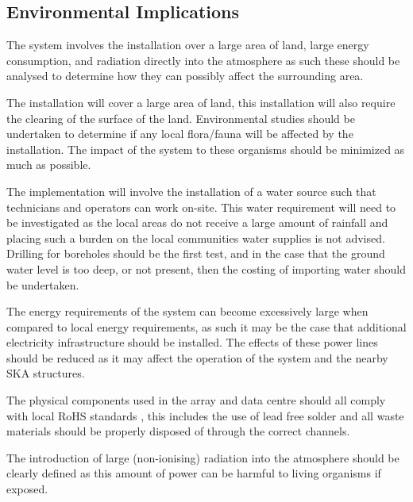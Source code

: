 \documentclass[11pt]{witseiepaper}
\begin{document}
\begin{bibunit}[witseie]


\subsection{Environmental Implications} \label{sec:EnvironmentalImplications}
The system involves the installation over a large area of land, large energy consumption, and radiation directly into the atmosphere as such these should be analysed to determine how they can possibly affect the surrounding area.

The installation will cover a large area of land, this installation will also require the clearing of the surface of the land. Environmental studies should be undertaken to determine if any local flora/fauna will be affected by the installation. The impact of the system to these organisms should be minimized as much as possible.

The implementation will involve the installation of a water source such that technicians and operators can work on-site. This water requirement will need to be investigated as the local areas do not receive a large amount of rainfall and placing such a burden on the local communities water supplies is not advised. Drilling for boreholes should be the first test, and in the case that the ground water level is too deep, or not present, then the costing of importing water should be undertaken.

The energy requirements of the system can become excessively large when compared to local energy requirements, as such it may be the case that additional electricity infrastructure should be installed. The effects of these power lines should be reduced as it may affect the operation of the system and the nearby SKA structures.


The physical components used in the array and data centre should all comply with local RoHS standards \cite{RoHS}, this includes the use of lead free solder and all waste materials should be properly disposed of through the correct channels.

The introduction of large (non-ionising) radiation into the atmosphere should be clearly defined as this amount of power can be harmful to living organisms if exposed.



\end{bibunit}
\end{document}
